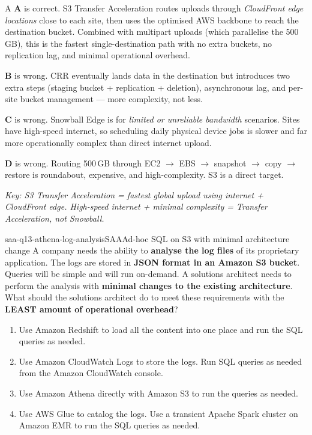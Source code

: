 \begin{answer}{A}
\textbf{A} is correct. S3 Transfer Acceleration routes uploads through \emph{CloudFront edge locations} close to each site, then uses the optimised AWS backbone to reach the destination bucket. Combined with multipart uploads (which parallelise the 500\,GB), this is the fastest single-destination path with no extra buckets, no replication lag, and minimal operational overhead.

\textbf{B} is wrong. CRR eventually lands data in the destination but introduces two extra steps (staging bucket + replication + deletion), asynchronous lag, and per-site bucket management --- more complexity, not less.

\textbf{C} is wrong. Snowball Edge is for \emph{limited or unreliable bandwidth} scenarios. Sites have high-speed internet, so scheduling daily physical device jobs is slower and far more operationally complex than direct internet upload.

\textbf{D} is wrong. Routing 500\,GB through EC2 $\to$ EBS $\to$ snapshot $\to$ copy $\to$ restore is roundabout, expensive, and high-complexity. S3 is a direct target.

\textit{Key: S3 Transfer Acceleration = fastest global upload using internet + CloudFront edge. High-speed internet + minimal complexity = Transfer Acceleration, not Snowball.}
\end{answer}


\begin{question}{saa-q13-athena-log-analysis}{SAA}{Ad-hoc SQL on S3 with minimal architecture change}
A company needs the ability to \textbf{analyse the log files} of its proprietary application.
The logs are stored in \textbf{JSON format in an Amazon S3 bucket}.
Queries will be simple and will run on-demand.
A solutions architect needs to perform the analysis with \textbf{minimal changes to the existing architecture}.
What should the solutions architect do to meet these requirements with the \textbf{LEAST amount of operational overhead}?

\begin{enumerate}[label=\Alph*.]
  \item Use Amazon Redshift to load all the content into one place and run the SQL queries as needed.
  \item Use Amazon CloudWatch Logs to store the logs. Run SQL queries as needed from the Amazon CloudWatch console.
  \item Use Amazon Athena directly with Amazon S3 to run the queries as needed.
  \item Use AWS Glue to catalog the logs. Use a transient Apache Spark cluster on Amazon EMR to run the SQL queries as needed.
\end{enumerate}
\end{question}

